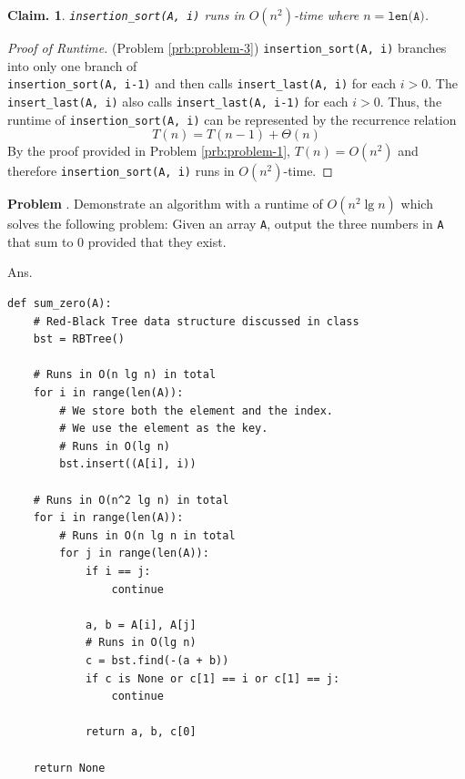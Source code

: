 \documentclass[11pt]{article}
\newcounter{problem}
\newcommand{\problem}[1]{
    \refstepcounter{problem}
    \noindent\textbf{Problem \theproblem}. #1
}
\theoremstyle{claim}
\newtheorem*{claim}{Claim.}
\newcommand{\answer}[1]{
    \noindent Ans. #1
}
\begin{document}
\pagebreak

\noindent
\begin{claim}
\texttt{insertion\_sort(A, i)} runs in \(O(n^2)\)-time where \(n = \texttt{len(A)}\).
\end{claim}
\begin{proof}[Proof of Runtime]{(Problem \ref{prb:problem-3})}
\noindent
\texttt{insertion\_sort(A, i)} branches into only one branch of\\ \texttt{insertion\_sort(A, i-1)} and then calls \texttt{insert\_last(A, i)} for each \(i > 0\). The \texttt{insert\_last(A, i)} also calls \texttt{insert\_last(A, i-1)} for each \(i > 0\). Thus, the runtime of \texttt{insertion\_sort(A, i)} can be represented by the recurrence relation
\[T(n) = T(n - 1) + \Theta(n)\]
By the proof provided in Problem \ref{prb:problem-1}, \(T(n) = O(n^2)\) and therefore \texttt{insertion\_sort(A, i)} runs in \(O(n^2)\)-time.
\end{proof}

\pagebreak

\problem{%
    Demonstrate an algorithm with a runtime of \(O(n^2 \lg n)\) which solves the following problem: Given an array \texttt{A}, output the three numbers in \texttt{A} that sum to 0 provided that they exist.
}

\answer{}
\begin{listing}[h]
\centering
\begin{verbatim}
def sum_zero(A):
    # Red-Black Tree data structure discussed in class
    bst = RBTree()

    # Runs in O(n lg n) in total
    for i in range(len(A)):
        # We store both the element and the index.
        # We use the element as the key.
        # Runs in O(lg n)
        bst.insert((A[i], i)) 

    # Runs in O(n^2 lg n) in total
    for i in range(len(A)):
        # Runs in O(n lg n in total
        for j in range(len(A)):
            if i == j:
                continue

            a, b = A[i], A[j]
            # Runs in O(lg n)
            c = bst.find(-(a + b))
            if c is None or c[1] == i or c[1] == j:
                continue

            return a, b, c[0]

    return None
\end{verbatim}
\end{listing}
\end{document}
